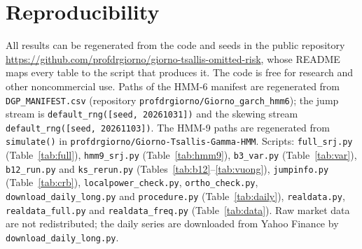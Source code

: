 \documentclass[11pt,a4paper]{article}
\theoremstyle{definition}
\theoremstyle{remark}
\begin{document}
\section{Reproducibility}
All results can be regenerated from the code and seeds in the public repository \url{https://github.com/profdrgiorno/giorno-tsallis-omitted-risk}, whose README maps every table to the script that produces it. The code is free for research and other noncommercial use. Paths of the HMM-6 manifest are regenerated from \texttt{DGP\_MANIFEST.csv} (repository \texttt{profdrgiorno/\allowbreak Giorno\_garch\_hmm6}); the jump stream is \texttt{default\_rng([seed, 20261031])} and the skewing stream \texttt{default\_rng([seed, 20261103])}. The HMM-9 paths are regenerated from \texttt{simulate()} in \texttt{profdrgiorno/\allowbreak Giorno-Tsallis-Gamma-HMM}. Scripts: \texttt{full\_srj.py} (Table~\ref{tab:full}), \texttt{hmm9\_srj.py} (Table~\ref{tab:hmm9}), \texttt{b3\_var.py} (Table~\ref{tab:var}), \texttt{b12\_run.py} and \texttt{ks\_rerun.py} (Tables~\ref{tab:b12}--\ref{tab:vuong}), \texttt{jumpinfo.py} (Table~\ref{tab:crb}), \texttt{localpower\_check.py}, \texttt{ortho\_check.py}, \texttt{download\_daily\_long.py} and \texttt{procedure.py} (Table~\ref{tab:daily}), \texttt{realdata.py}, \texttt{realdata\_full.py} and \texttt{realdata\_freq.py} (Table~\ref{tab:data}). Raw market data are not redistributed; the daily series are downloaded from Yahoo Finance by \texttt{download\_daily\_long.py}.
\end{document}
